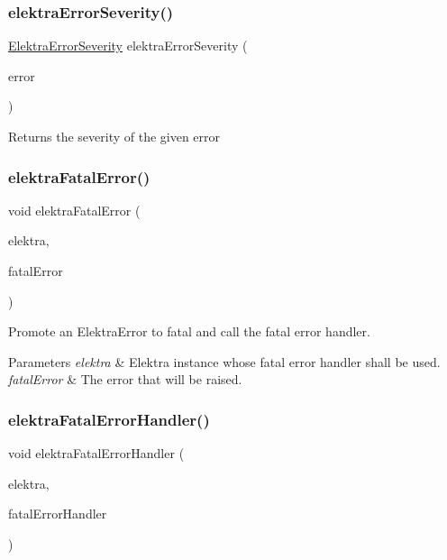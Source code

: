 \subsubsection{\texorpdfstring{elektra\+Error\+Severity()}{elektraErrorSeverity()}}
{\footnotesize\ttfamily \hyperlink{kdbprivate_8h_a12c616a1033bddd43fab10d0f777daad}{Elektra\+Error\+Severity} elektra\+Error\+Severity (\begin{DoxyParamCaption}\item[{const Elektra\+Error $\ast$}]{error }\end{DoxyParamCaption})}

\begin{DoxyReturn}{Returns}
the severity of the given error 
\end{DoxyReturn}
\mbox{\label{group__highlevel_ga57d87ff6defe4db402b772ab2a0025f9}} 
\subsubsection{\texorpdfstring{elektra\+Fatal\+Error()}{elektraFatalError()}}
{\footnotesize\ttfamily void elektra\+Fatal\+Error (\begin{DoxyParamCaption}\item[{Elektra $\ast$}]{elektra,  }\item[{Elektra\+Error $\ast$}]{fatal\+Error }\end{DoxyParamCaption})}



Promote an Elektra\+Error to fatal and call the fatal error handler. 


\begin{DoxyParams}{Parameters}
{\em elektra} & Elektra instance whose fatal error handler shall be used. \\
\hline
{\em fatal\+Error} & The error that will be raised. \\
\hline
\end{DoxyParams}
\mbox{\label{group__highlevel_ga496441e9e1dd80ed14a239dfc4c08c40}} 
\subsubsection{\texorpdfstring{elektra\+Fatal\+Error\+Handler()}{elektraFatalErrorHandler()}}
{\footnotesize\ttfamily void elektra\+Fatal\+Error\+Handler (\begin{DoxyParamCaption}\item[{Elektra $\ast$}]{elektra,  }\item[{Elektra\+Error\+Handler}]{fatal\+Error\+Handler }\end{DoxyParamCaption})}



